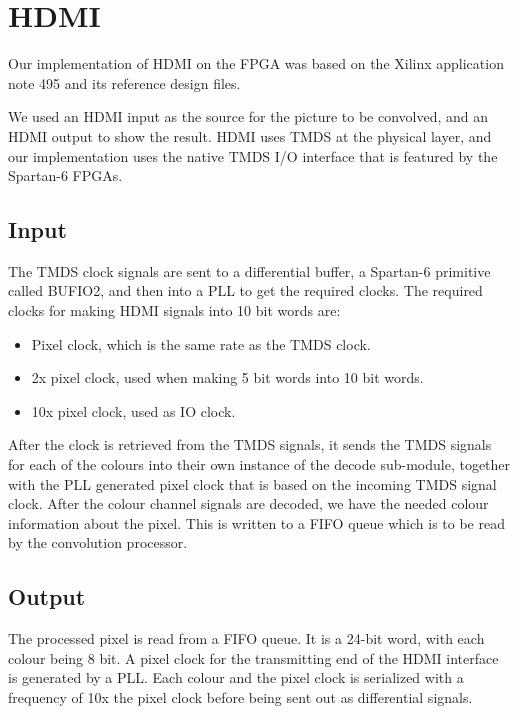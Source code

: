 \section{HDMI}
Our implementation of HDMI on the FPGA was based on the Xilinx application note 495 \cite{xapp495} and its reference design files.

We used an HDMI input as the source for the picture to be convolved, and an HDMI output to show the result.
HDMI uses TMDS at the physical layer, and our implementation uses the native TMDS I/O interface that is featured by the Spartan-6 FPGAs.

\subsection{Input}
The TMDS clock signals are sent to a differential buffer, a Spartan-6 primitive called BUFIO2, and then into a PLL to get the required clocks. The required clocks for making HDMI signals into 10 bit words are:
\begin{itemize}
    \item   Pixel clock, which is the same rate as the TMDS clock.
    \item   2x pixel clock, used when making 5 bit words into 10 bit words.
    \item   10x pixel clock, used as IO clock.
\end{itemize}

After the clock is retrieved from the TMDS signals, it sends the TMDS signals for each of the colours into their own instance of the decode sub-module, together with the PLL generated pixel clock that is based on the incoming TMDS signal clock. After the colour channel signals are decoded, we have the needed colour information about the pixel. This is written to a FIFO queue which is to be read by the convolution processor.

\subsection{Output}

The processed pixel is read from a FIFO queue. It is a 24-bit word, with each colour being 8 bit. A pixel clock for the transmitting end of the HDMI interface is generated by a PLL. Each colour and the pixel clock is serialized with a frequency of 10x the pixel clock before being sent out as differential signals.
